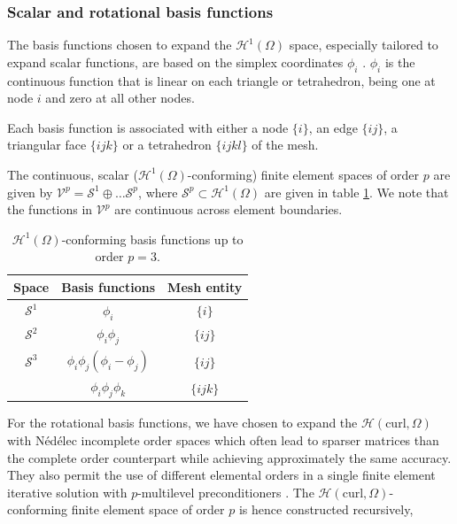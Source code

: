 \subsubsection{Scalar and rotational basis functions}

The basis functions chosen to expand the $\mathcal{H}^1(\Omega)$ space, especially tailored to expand scalar functions, are based on the simplex coordinates $\phi_i$ \cite{pelosi2009quick}. $\phi_i$ is the continuous function that is linear on each triangle or tetrahedron, being one at node $i$ and zero at all other nodes.

Each basis function is associated with either a node $\lbrace i \rbrace$, an edge $\lbrace ij \rbrace$, a triangular face $\lbrace ijk \rbrace$ or a tetrahedron $\lbrace ijkl \rbrace$ of the mesh.

The continuous, scalar ($\mathcal{H}^1(\Omega)$-conforming) finite element spaces of order $p$ are given by $\mathcal{V}^p = \mathcal{S}^1 \oplus \ldots \mathcal{S}^p$, where $\mathcal{S}^p \subset \mathcal{H}^1(\Omega)$ are given in table \ref{tab:H1functions}. We note that the functions in $\mathcal{V}^p$ are continuous across element boundaries.

\begin{table}[h!]
\begin{center}
\begin{tabular}{|c|c|c|}
\hline 
Space & Basis functions & Mesh entity \\ 
\hline
\hline 
$\mathcal{S}^1$ & $\phi_i$ & $\lbrace i \rbrace$ \\ 
\hline 
$\mathcal{S}^2$ & $\phi_i\phi_j$ & $\lbrace ij \rbrace$ \\ 
\hline 
$\mathcal{S}^3$ & $\phi_i\phi_j(\phi_i - \phi_j)$ & $\lbrace ij \rbrace$ \\ 
 & $\phi_i\phi_j\phi_k$ & $\lbrace ijk \rbrace$ \\ 
\hline 
\end{tabular} 
\end{center}
\caption{$\mathcal{H}^1(\Omega)$-conforming basis functions up to order $p = 3$.}
\label{tab:H1functions}
\end{table}


For the rotational basis functions, we have chosen to expand the $\mathcal{H}(\mathrm{curl},\Omega)$ with N\'ed\'elec incomplete order spaces \cite{nedelec1980mixed} which often lead to sparser matrices than the complete order counterpart while achieving approximately the same accuracy. They also permit the use of different elemental orders in a single finite element iterative solution with $p$-multilevel preconditioners \cite{sun2001construction}. The $\mathcal{H}(\mathrm{curl},\Omega)$-conforming finite element space of order $p$ is hence constructed recursively,


